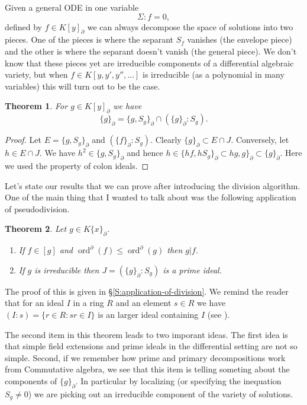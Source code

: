\documentclass[12pt]{book}
\numberwithin{equation}{section}
\newtheorem{theorem}{Theorem}[subsection]
\theoremstyle{definition}
\theoremstyle{remark}
\newcommand{\ord}{\operatorname{ord}}
\begin{document}
Given a general ODE in one variable
 $$ \Sigma \colon f=0, $$
defined by $f \in K[y]_{\partial}$ we can always decompose the space of solutions into two pieces. 
One of the pieces is where the separant $S_f$ vanishes (the envelope piece) and the other is where the separant doesn't vanish (the general piece). 
We don't know that these pieces yet are irreducible components of a differential algebraic variety, but when $f \in K[y,y',y'',\ldots]$ is irreducible (as a polynomial in many variables) this will turn out to be the case. 

\begin{theorem}
	For $g \in K[ y ]_{\partial}$ we have 
	 $$ \lbrace g \rbrace_{\partial} = \lbrace g, S_g \rbrace_{\partial} \cap ( \lbrace g \rbrace_{\partial} \colon S_g).$$
\end{theorem}
\begin{proof}
	Let $E= \lbrace g,S_g \rbrace_{\partial}$ and $( \lbrace f \rbrace_{\partial} \colon S_g)$. 
	Clearly $\lbrace g \rbrace_{\partial} \subset E \cap J$.
	Conversely, let $h \in E \cap J$. 
	We have $h^2 \in \lbrace g, S_g \rbrace_{\partial}$ and hence $h \in \lbrace hf, h S_g\rbrace_{\partial} \subset hg,g\rbrace_{\partial} \subset \lbrace g \rbrace_{\partial}$. 
	Here we used the property of colon ideals. 
\end{proof}

Let's state our results that we can prove after introducing the division algorithm.
One of the main thing that I wanted to talk about was the following application of pseudodivision. 
\begin{theorem}
	Let $g \in K \lbrace x \rbrace_{\partial}$. 
	\begin{enumerate}[topsep=0pt]
		\item If $f \in [g]$ and $\ord^{\partial}(f) \leq \ord^{\partial}(g)$ then $g \vert f$. 
		\item If $g$ is irreducible then $J = ( \lbrace g \rbrace_{\partial} : S_g)$ is a prime ideal. 
	\end{enumerate}
\end{theorem}
The proof of this is given in \S\ref{S:application-of-division}.
We remind the reader that for an ideal $I$ in a ring $R$ and an element $s\in R$ we have $(I:s) = \lbrace r \in R \colon sr \in I\rbrace$ is an larger ideal containing $I$ (see \cite{Atiyah2016}).


The second item in this theorem leads to two imporant ideas. 
The first idea is that simple field extensions and prime ideals in the differential setting are not so simple. 
Second, if we remember how prime and primary decompositions work from Commutative algebra, we see that this item is telling someting about the components of $\lbrace g\rbrace_{\partial}$.
In particular by localizing (or specifying the inequation $S_g\neq 0$) we are picking out an irreducible component of the variety of solutions.
\end{document}
